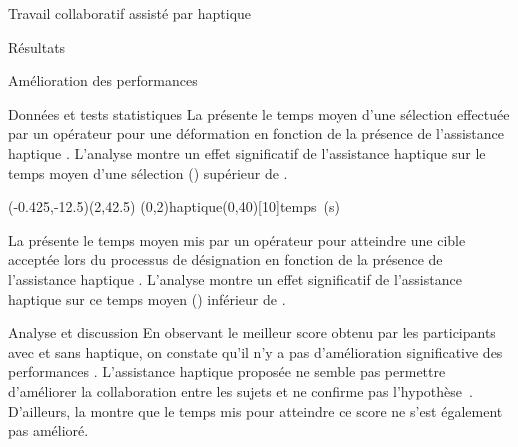 \documentclass[myfrancais,ngerman,english,frenchb]{mythesis}
\begin{document}
\begin{mychapter}{Travail collaboratif assisté par haptique}
\begin{mysection}{Résultats}
\begin{mysubsection}{Amélioration des performances}
\begin{mysubsubsection}{Données et tests statistiques}
					La  présente le temps moyen d'une sélection effectuée par un opérateur pour une déformation  en fonction de la présence de l'assistance haptique .
					L'analyse montre un effet significatif de l'assistance haptique  sur le temps moyen d'une sélection  () supérieur de .

					\begin{myfigure}
						\begin{myps}(-0.425,-12.5)(2,42.5)
							\myaxes(0,2){haptique}(0,40)[10]{temps~(s)}
						\end{myps}
					\end{myfigure}

					La  présente le temps moyen mis par un opérateur pour atteindre une cible acceptée lors du processus de désignation  en fonction de la présence de l'assistance haptique .
					L'analyse montre un effet significatif de l'assistance haptique  sur ce temps moyen  () inférieur de .
				\end{mysubsubsection}
				\begin{mysubsubsection}{Analyse et discussion}
					En observant le meilleur score  obtenu par les participants avec et sans haptique, on constate qu'il n'y a pas d'amélioration significative des performances .
					L'assistance haptique proposée ne semble pas permettre d'améliorer la collaboration entre les sujets et ne confirme pas l'hypothèse~.
					D'ailleurs, la  montre que le temps mis pour atteindre ce score ne s'est également pas amélioré.


\end{mysubsubsection}
\end{mysubsection}
\end{mysection}
\end{mychapter}
\end{document}
